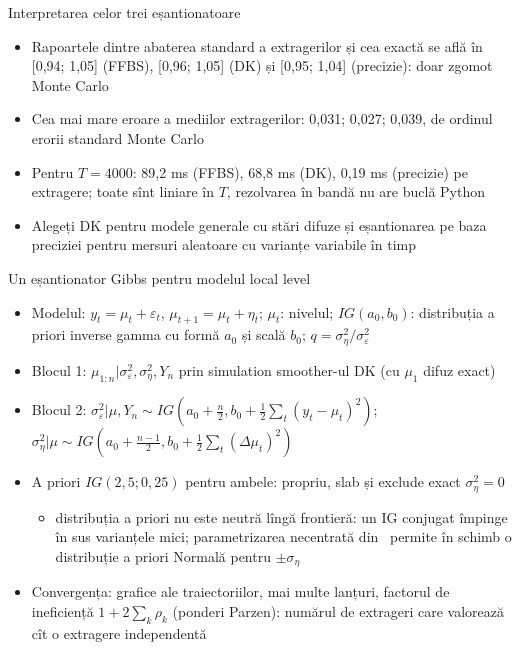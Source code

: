\begin{frame}{Interpretarea celor trei eșantionatoare}
\itemsize{\small}
\begin{itemize}
    \item Rapoartele dintre abaterea standard a extragerilor și cea exactă se află în [0{,}94; 1{,}05] (FFBS), [0{,}96; 1{,}05] (DK) și [0{,}95; 1{,}04] (precizie): doar zgomot Monte Carlo
    \item Cea mai mare eroare a mediilor extragerilor: 0{,}031; 0{,}027; 0{,}039, de ordinul erorii standard Monte Carlo
    \item Pentru $T = 4000$: 89{,}2 ms (FFBS), 68{,}8 ms (DK), 0{,}19 ms (precizie) pe extragere; toate sînt liniare în $T$, rezolvarea în bandă nu are buclă Python
    \item Alegeți DK pentru modele generale cu stări difuze și eșantionarea pe baza preciziei pentru mersuri aleatoare cu varianțe variabile în timp
\end{itemize}
\end{frame}

\begin{frame}{Un eșantionator Gibbs pentru modelul local level}
\itemsize{\small}
\begin{itemize}
    \item Modelul: $y_t = \mu_t + \varepsilon_t$, $\mu_{t+1} = \mu_t + \eta_t$; $\mu_t$: nivelul; $IG(a_0, b_0)$: distribuția a priori inverse gamma cu formă $a_0$ și scală $b_0$; $q = \sigma^2_\eta/\sigma^2_\varepsilon$
    \item Blocul 1: $\mu_{1:n} | \sigma^2_\varepsilon, \sigma^2_\eta, Y_n$ prin simulation smoother-ul DK (cu $\mu_1$ difuz exact)
    \item Blocul 2: $\sigma^2_\varepsilon | \mu, Y_n \sim IG(a_0 + \frac n2, b_0 + \frac12\sum_t(y_t - \mu_t)^2)$; $\sigma^2_\eta | \mu \sim IG(a_0 + \frac{n-1}{2}, b_0 + \frac12\sum_t(\Delta\mu_t)^2)$
    \item A priori $IG(2{,}5; 0{,}25)$ pentru ambele: propriu, slab și exclude exact $\sigma^2_\eta = 0$
    \begin{itemize}
        \item distribuția a priori nu este neutră lîngă frontieră: un IG conjugat împinge în sus varianțele mici; parametrizarea necentrată din \ permite în schimb o distribuție a priori Normală pentru $\pm\sigma_\eta$
    \end{itemize}
    \item Convergența: grafice ale traiectoriilor, mai multe lanțuri, factorul de ineficiență $1 + 2\sum_k\rho_k$ (ponderi Parzen): numărul de extrageri care valorează cît o extragere independentă 
\end{itemize}
\end{frame}

